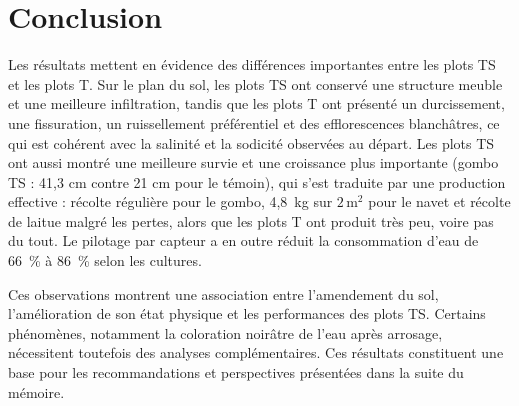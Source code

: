 \section{Conclusion}
Les résultats mettent en évidence des différences importantes entre les plots TS et les plots T. Sur le plan du sol, les plots TS ont conservé une structure meuble et une meilleure infiltration, tandis que les plots T ont présenté un durcissement, une fissuration, un ruissellement préférentiel et des efflorescences blanchâtres, ce qui est cohérent avec la salinité et la sodicité observées au départ. 
Les plots TS ont aussi montré une meilleure survie et une croissance plus importante (gombo TS : 41,3 cm contre 21 cm pour le témoin), qui s’est traduite par une production effective : récolte régulière pour le gombo, 4,8~kg sur $2\,\mathrm{m^2}$ pour le navet et récolte de laitue malgré les pertes, alors que les plots T ont produit très peu, voire pas du tout. Le pilotage par capteur a en outre réduit la consommation d’eau de 66~\% à 86~\% selon les cultures.

Ces observations montrent une association entre l’amendement du sol, l’amélioration de son état physique et les performances des plots TS. Certains phénomènes, notamment la coloration noirâtre de l’eau après arrosage, nécessitent toutefois des analyses complémentaires. Ces résultats constituent une base pour les recommandations et perspectives présentées dans la suite du mémoire.